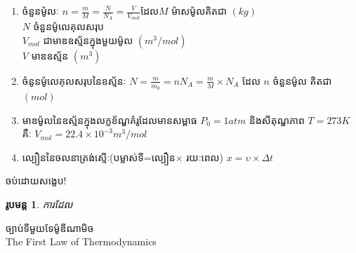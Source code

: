 \documentclass[12pt, a4paper]{article}
\newtheorem*{exc*}{\kml រូបមន្ត}
\begin{document}
\begin{enumerate}[I]
\begin{itemize}
\begin{enumerate}[m]
		\item ចំនួនម៉ូលៈ $n=\frac{m}{M}=\frac{N}{N_{A}}=\frac{V}{V_{mol}}$\quad ដែល\quad $M$ ម៉ាសម៉ូលគិតជា $\left(kg\right)$\\
		$N$ ចំនួនម៉ូលេគុលសរុប\\
		$V_{mol}$ ជាមាឌឧស្ម័នក្នុងមួយម៉ូល $\left(m^3/mol\right)$\\
		$V$ មាឌឧស្ម័ន $\left(m^3\right)$
		\item ចំនូនម៉ូលេគុលសរុបនៃឧស្ម័នៈ $N=\frac{m}{m_{0}}=nN_{A}=\frac{m}{M}\times N_{A}$ ដែល $n$ ចំនួនម៉ូល​ គិតជា $\left(mol\right)$
		\item មាឌម៉ូលនៃឧស្ម័នក្នុងលក្ខខ័ណ្ឌគំរូដែលមានសម្ពាធ $P_{0}=1atm$ និងសីតុណ្ហភាព $T=273K$ គឺៈ $V_{mol}=22.4\times10^{-3}m^3/mol$
		\item ល្បឿននៃចលនាត្រង់ស្មើៈ(បម្លាស់ទី=ល្បឿន$\times$ រយៈពេល) $x=\upsilon\times\Delta t$
	\end{enumerate}
\end{itemize}
\end{enumerate}
\begin{center}
	\sffamily\color{blue}
	\huge ចប់ដោយសង្ខេប!
\end{center}
\newpage
\begin{exc*}
	ការដែល
\end{exc*}
\newpage
\begin{center}
	{\kml \large ច្បាប់ទីមួយទែម៉ូឌីណាមិច}\\
	{\enb \large The First Law of Thermodynamics}
\end{center}
\end{document}
